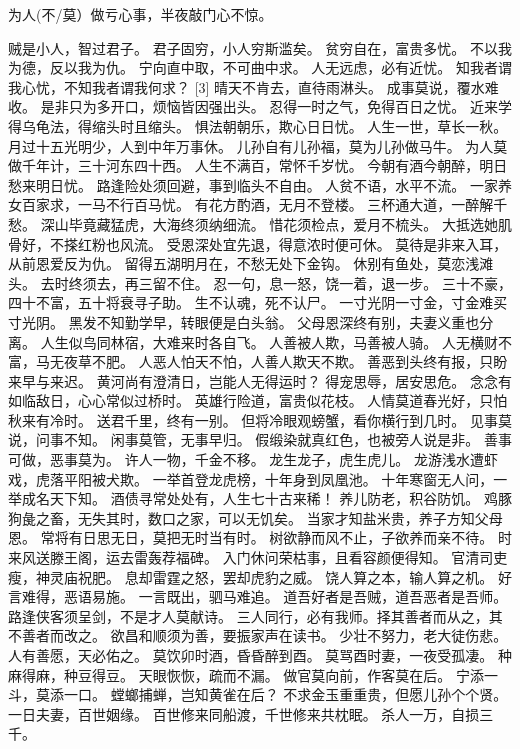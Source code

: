 \documentclass[12pt,UTF8]{ctexbook}
\begin{document}
为人(不/莫）做亏心事，半夜敲门心不惊。

贼是小人，智过君子。
君子固穷，小人穷斯滥矣。
贫穷自在，富贵多忧。
不以我为德，反以我为仇。
宁向直中取，不可曲中求。
人无远虑，必有近忧。
知我者谓我心忧，不知我者谓我何求？ [3]
晴天不肯去，直待雨淋头。
成事莫说，覆水难收。
是非只为多开口，烦恼皆因强出头。
忍得一时之气，免得百日之忧。
近来学得乌龟法，得缩头时且缩头。
惧法朝朝乐，欺心日日忧。
人生一世，草长一秋。
月过十五光明少，人到中年万事休。
儿孙自有儿孙福，莫为儿孙做马牛。
为人莫做千年计，三十河东四十西。
人生不满百，常怀千岁忧。
今朝有酒今朝醉，明日愁来明日忧。
路逢险处须回避，事到临头不自由。
人贫不语，水平不流。
一家养女百家求，一马不行百马忧。
有花方酌酒，无月不登楼。
三杯通大道，一醉解千愁。
深山毕竟藏猛虎，大海终须纳细流。
惜花须检点，爱月不梳头。
大抵选她肌骨好，不搽红粉也风流。
受恩深处宜先退，得意浓时便可休。
莫待是非来入耳，从前恩爱反为仇。
留得五湖明月在，不愁无处下金钩。
休别有鱼处，莫恋浅滩头。
去时终须去，再三留不住。
忍一句，息一怒，饶一着，退一步。
三十不豪，四十不富，五十将衰寻子助。
生不认魂，死不认尸。
一寸光阴一寸金，寸金难买寸光阴。
黑发不知勤学早，转眼便是白头翁。
父母恩深终有别，夫妻义重也分离。
人生似鸟同林宿，大难来时各自飞。
人善被人欺，马善被人骑。
人无横财不富，马无夜草不肥。
人恶人怕天不怕，人善人欺天不欺。
善恶到头终有报，只盼来早与来迟。
黄河尚有澄清日，岂能人无得运时？
得宠思辱，居安思危。
念念有如临敌日，心心常似过桥时。
英雄行险道，富贵似花枝。
人情莫道春光好，只怕秋来有冷时。
送君千里，终有一别。
但将冷眼观螃蟹，看你横行到几时。
见事莫说，问事不知。
闲事莫管，无事早归。
假缎染就真红色，也被旁人说是非。
善事可做，恶事莫为。
许人一物，千金不移。
龙生龙子，虎生虎儿。
龙游浅水遭虾戏，虎落平阳被犬欺。
一举首登龙虎榜，十年身到凤凰池。
十年寒窗无人问，一举成名天下知。
酒债寻常处处有，人生七十古来稀！
养儿防老，积谷防饥。
鸡豚狗彘之畜，无失其时，数口之家，可以无饥矣。
当家才知盐米贵，养子方知父母恩。
常将有日思无日，莫把无时当有时。
树欲静而风不止，子欲养而亲不待。
时来风送滕王阁，运去雷轰荐福碑。
入门休问荣枯事，且看容颜便得知。
官清司吏瘦，神灵庙祝肥。
息却雷霆之怒，罢却虎豹之威。
饶人算之本，输人算之机。
好言难得，恶语易施。
一言既出，驷马难追。
道吾好者是吾贼，道吾恶者是吾师。
路逢侠客须呈剑，不是才人莫献诗。
三人同行，必有我师。择其善者而从之，其不善者而改之。
欲昌和顺须为善，要振家声在读书。
少壮不努力，老大徒伤悲。
人有善愿，天必佑之。
莫饮卯时酒，昏昏醉到酉。
莫骂酉时妻，一夜受孤凄。
种麻得麻，种豆得豆。
天眼恢恢，疏而不漏。
做官莫向前，作客莫在后。
宁添一斗，莫添一口。
螳螂捕蝉，岂知黄雀在后？
不求金玉重重贵，但愿儿孙个个贤。
一日夫妻，百世姻缘。
百世修来同船渡，千世修来共枕眠。
杀人一万，自损三千。
\end{document}
